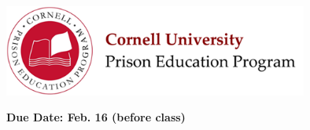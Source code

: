 \documentclass[addpoints,12pt]{exam}
\begin{document}

\begin{flushright}
\vspace{0.2in}

\end{flushright}

\begin{center}
\includegraphics[width=10cm]{../images/logo.png}
\end{center}

\begin{center}
\end{center}

\noindent\begin{large}\textbf{Due Date: Feb. 16 (before class)}\end{large}
\vspace{0.2in}
\end{document}

